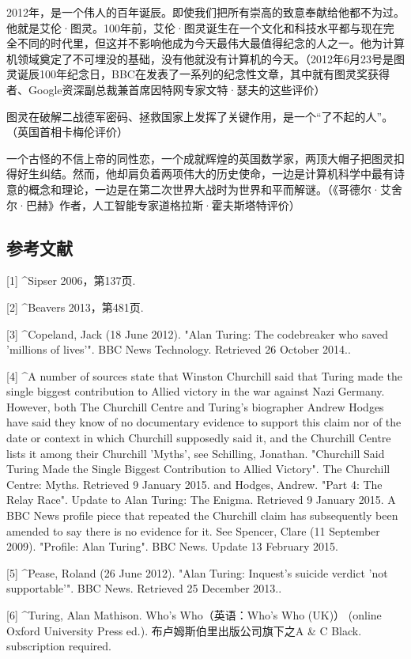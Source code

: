 2012年，是一个伟人的百年诞辰。即使我们把所有崇高的致意奉献给他都不为过。他就是艾伦·图灵。100年前，艾伦·图灵诞生在一个文化和科技水平都与现在完全不同的时代里，但这并不影响他成为今天最伟大最值得纪念的人之一。他为计算机领域奠定了不可埋没的基础，没有他就没有计算机的今天。（2012年6月23号是图灵诞辰100年纪念日，BBC在发表了一系列的纪念性文章，其中就有图灵奖获得者、Google资深副总裁兼首席因特网专家文特·瑟夫的这些评价）

图灵在破解二战德军密码、拯救国家上发挥了关键作用，是一个“了不起的人”。（英国首相卡梅伦评价）

一个古怪的不信上帝的同性恋，一个成就辉煌的英国数学家，两顶大帽子把图灵扣得好生纠结。然而，他却肩负着两项伟大的历史使命，一边是计算机科学中最有诗意的概念和理论，一边是在第二次世界大战时为世界和平而解谜。（《哥德尔·艾舍尔·巴赫》作者，人工智能专家道格拉斯·霍夫斯塔特评价）

\subsection{参考文献}
[1]
^Sipser 2006，第137页.

[2]
^Beavers 2013，第481页.

[3]
^Copeland, Jack (18 June 2012). "Alan Turing: The codebreaker who saved 'millions of lives'". BBC News Technology. Retrieved 26 October 2014..

[4]
^A number of sources state that Winston Churchill said that Turing made the single biggest contribution to Allied victory in the war against Nazi Germany. However, both The Churchill Centre and Turing's biographer Andrew Hodges have said they know of no documentary evidence to support this claim nor of the date or context in which Churchill supposedly said it, and the Churchill Centre lists it among their Churchill 'Myths', see Schilling, Jonathan. "Churchill Said Turing Made the Single Biggest Contribution to Allied Victory". The Churchill Centre: Myths. Retrieved 9 January 2015. and Hodges, Andrew. "Part 4: The Relay Race". Update to Alan Turing: The Enigma. Retrieved 9 January 2015. A BBC News profile piece that repeated the Churchill claim has subsequently been amended to say there is no evidence for it. See Spencer, Clare (11 September 2009). "Profile: Alan Turing". BBC News. Update 13 February 2015.

[5]
^Pease, Roland (26 June 2012). "Alan Turing: Inquest's suicide verdict 'not supportable'". BBC News. Retrieved 25 December 2013..

[6]
^Turing, Alan Mathison. Who's Who（英语：Who's Who (UK)） (online Oxford University Press ed.). 布卢姆斯伯里出版公司旗下之A & C Black. subscription required.

